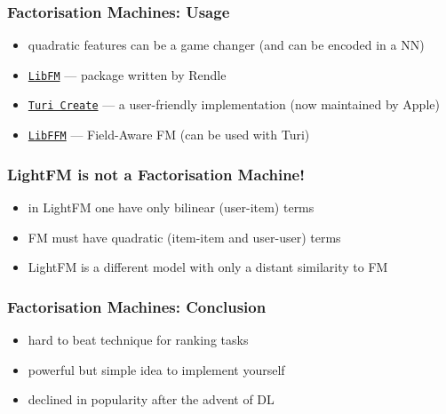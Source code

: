 \documentclass{beamer}
\begin{document}
\begin{frame}
  \frametitle{Factorisation Machines: Usage}
  \begin{itemize}
  \item quadratic features can be a game changer (and can be encoded in a NN)
  \item \href{http://libfm.org/}{\texttt{LibFM}} --- package written by Rendle
  \item \href{https://pypi.org/project/turicreate}{\texttt{Turi Create}} --- a user-friendly implementation (now maintained by Apple)
  \item \href{https://github.com/ycjuan/libffm}{\texttt{LibFFM}} --- Field-Aware FM (can be used with Turi)
  \end{itemize}
\end{frame}
\begin{frame}
  \frametitle{LightFM is not a Factorisation Machine!}
  \begin{itemize}
  \item in LightFM one have only bilinear (user-item) terms
  \item FM must have quadratic (item-item and user-user) terms
  \item LightFM is a different model with only a distant similarity to FM
  \end{itemize}
\end{frame}
\begin{frame}
  \frametitle{Factorisation Machines: Conclusion}
  \begin{itemize}
  \item hard to beat technique for ranking tasks
  \item powerful but simple idea to implement yourself
  \item declined in popularity after the advent of DL
  \end{itemize}
\end{frame}
\end{document}

